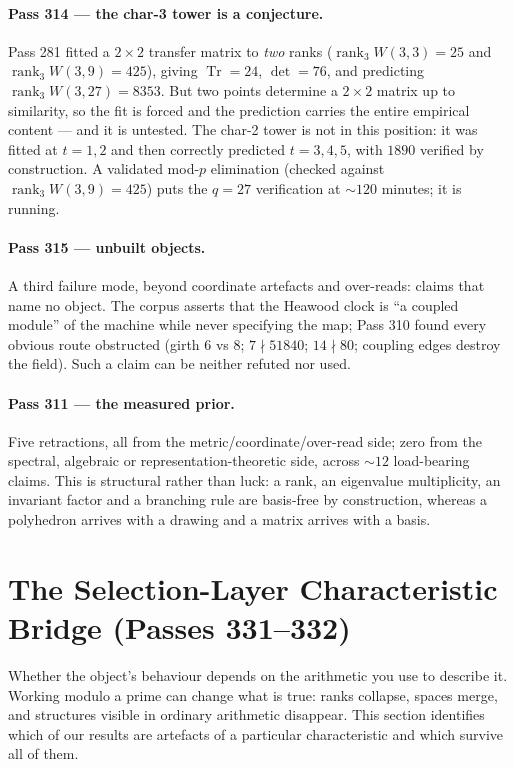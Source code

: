 \documentclass[12pt,a4paper]{article}
\theoremstyle{definition}
\begin{document}
\paragraph{Pass 314 --- the char-3 tower is a conjecture.} Pass 281 fitted a
$2\times2$ transfer matrix to \emph{two} ranks ($\operatorname{rank}_3W(3,3)=25$
and $\operatorname{rank}_3W(3,9)=425$), giving $\operatorname{Tr}=24$,
$\det=76$, and predicting $\operatorname{rank}_3W(3,27)=8353$. But two points
determine a $2\times2$ matrix up to similarity, so the fit is forced and the
prediction carries the entire empirical content --- and it is untested. The char-2
tower is not in this position: it was fitted at $t=1,2$ and then correctly
predicted $t=3,4,5$, with $1890$ verified by construction. A validated mod-$p$
elimination (checked against $\operatorname{rank}_3W(3,9)=425$) puts the $q=27$
verification at ${\sim}120$ minutes; it is running.

\paragraph{Pass 315 --- unbuilt objects.} A third failure mode, beyond coordinate
artefacts and over-reads: claims that name no object. The corpus asserts that the
Heawood clock is ``a coupled module'' of the machine while never specifying the
map; Pass 310 found every obvious route obstructed (girth $6$ vs $8$; $7\nmid
51840$; $14\nmid 80$; coupling edges destroy the field). Such a claim can be
neither refuted nor used.

\paragraph{Pass 311 --- the measured prior.} Five retractions, all from the
metric/coordinate/over-read side; zero from the spectral, algebraic or
representation-theoretic side, across ${\sim}12$ load-bearing claims. This is
structural rather than luck: a rank, an eigenvalue multiplicity, an invariant
factor and a branching rule are basis-free by construction, whereas a polyhedron
arrives with a drawing and a matrix arrives with a basis.


\section{The Selection-Layer Characteristic Bridge (Passes 331--332)}

\begin{plainbox}
Whether the object's behaviour depends on the arithmetic you use to describe it.
Working modulo a prime can change what is true: ranks collapse, spaces merge, and structures
visible in ordinary arithmetic disappear. This section identifies which of our results are
artefacts of a particular characteristic and which survive all of them.
\end{plainbox}
\end{document}

